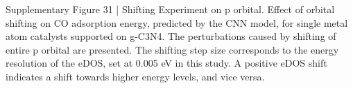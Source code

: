 Supplementary Figure 31 | Shifting Experiment on p orbital. Effect of orbital shifting on CO adsorption energy, predicted by the CNN model, for single metal atom catalysts supported on g-C3N4. The perturbations caused by shifting of entire p orbital are presented. The shifting step size corresponds to the energy resolution of the eDOS, set at 0.005 eV in this study. A positive eDOS shift indicates a shift towards higher energy levels, and vice versa.
